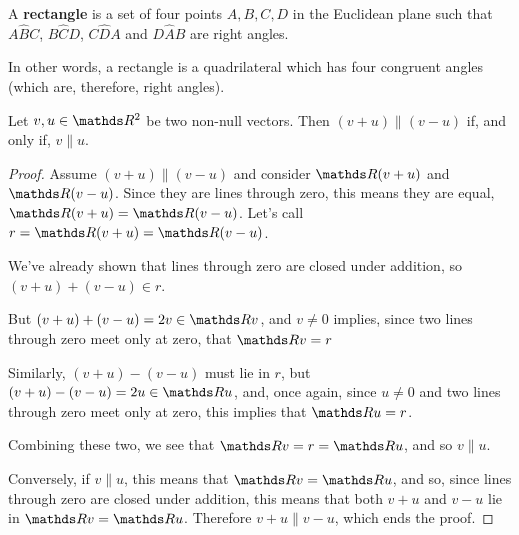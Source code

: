 \begin{df}
	A \textbf{rectangle} is a set of four points $A,B,C,D$ in the Euclidean plane such that $A\hat{B}C$, $B\hat{C}D$, $C\hat{D}A$ and $D\hat{A}B$ are right angles.
	
	In other words, a rectangle is a quadrilateral which has four congruent angles (which are, therefore, right angles).
\end{df}
\begin{lemma}
	Let $v,u\in \R^2$ be two non-null vectors. Then $(v+u)\parallel(v-u)$ if, and only if, $v\parallel u$.
\end{lemma}
\begin{proof}
	Assume $(v+u)\parallel(v-u)$ and consider $\R(v+u)$ and $\R(v-u)$. Since they are lines through zero, this means they are equal, $\R(v+u)=\R(v-u)$. Let's call $r=\R (v+u)=\R(v-u)$.
	
	We've already shown that lines through zero are closed under addition, so $(v+u)+(v-u)\in r$.
	
	But $(v+u)+(v-u)=2v\in \R v$, and $v\neq 0$ implies, since two lines through zero meet only at zero, that $\R v=r$
	
	Similarly, $(v+u)-(v-u)$ must lie in $r$, but $(v+u)-(v-u)=2u\in \R u$, and, once again, since $u\neq 0$ and two lines through zero meet only at zero, this implies that $\R u=r$.
	
	Combining these two, we see that $\R v=r=\R u$, and so $v\parallel u$.
	
	\bigskip
	Conversely, if $v\parallel u$, this means that $\R v=\R u$, and so, since lines through zero are closed under addition, this means that both $v+u$ and $v-u$ lie in $\R v=\R u$. Therefore $v+u\parallel v-u$, which ends the proof.
\end{proof}

